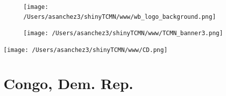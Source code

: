 \documentclass{article}\usepackage[]{graphicx}\usepackage[]{color}
\begin{document}
%

\begin{figure}
  \vspace{-3ex} %
  \hspace{-7ex} %
  \texttt{[image: /Users/asanchez3/shinyTCMN/www/wb\_logo\_background.png]}
\end{figure}
\begin{figure}
  \begin{minipage}[t]{0.99\textwidth} %
      \vspace{-30ex}
      \hspace{-2ex}
      \raggedright{\texttt{[image: /Users/asanchez3/shinyTCMN/www/TCMN\_banner3.png]}}
  \end{minipage}
\end{figure}
%
\begin{minipage}[t]{0.99\textwidth} %
  \vspace{-1.5cm}
  \begin{minipage}[c]{0.36\textwidth} 
    \begin{minipage}[c]{0.28\textwidth} %
      \texttt{[image: /Users/asanchez3/shinyTCMN/www/CD.png]}
    \end{minipage}
    \begin{minipage}[c]{0.70\textwidth} %
      \section*{\color{blue!40!black}Congo, Dem. Rep.}
    \end{minipage}
  \end{minipage}
  \begin{minipage}[c]{0.63\textwidth} %
    \centering
  \end{minipage}  
\end{minipage} %
\end{document}

